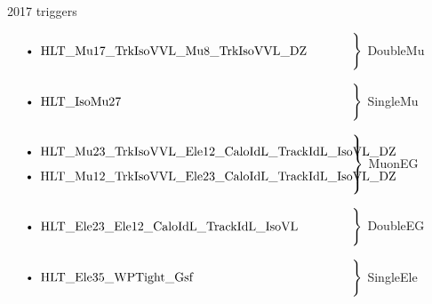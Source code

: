 \documentclass[9pt]{beamer}
\begin{document}
\begin{frame}{2017 triggers}
\justifying

$\left. \text{\parbox{0.8\linewidth}{
\begin{itemize}
\item HLT\_Mu17\_TrkIsoVVL\_Mu8\_TrkIsoVVL\_DZ
\end{itemize}
}} \right \}$ \alert{DoubleMu} \vfill

$\left. \text{\parbox{0.8\linewidth}{
\begin{itemize}
\item HLT\_IsoMu27
\end{itemize}
}} \right \}$ \alert{SingleMu} \vfill

$\left. \text{\parbox{0.8\linewidth}{
\begin{itemize}
\item HLT\_Mu23\_TrkIsoVVL\_Ele12\_CaloIdL\_TrackIdL\_IsoVL\_DZ
\item HLT\_Mu12\_TrkIsoVVL\_Ele23\_CaloIdL\_TrackIdL\_IsoVL\_DZ
\end{itemize}
}} \right \}$ \alert{MuonEG} \vfill

$\left. \text{\parbox{0.8\linewidth}{
\begin{itemize}
\item HLT\_Ele23\_Ele12\_CaloIdL\_TrackIdL\_IsoVL
\end{itemize}
}} \right \}$ \alert{DoubleEG} \vfill

$\left. \text{\parbox{0.8\linewidth}{
\begin{itemize}
\item HLT\_Ele35\_WPTight\_Gsf
\end{itemize}
}} \right \}$ \alert{SingleEle} \vfill
\end{frame}
\end{document}
